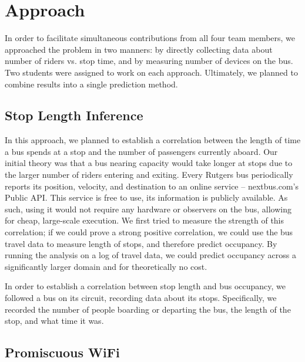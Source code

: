 \section{Approach}

In order to facilitate simultaneous contributions from all four team members, we approached the problem in two manners: by directly collecting data about number of riders vs. stop time, and by measuring number of devices on the bus.
Two students were assigned to work on each approach.
Ultimately, we planned to combine results into a single prediction method.

\subsection{Stop Length Inference}

In this approach, we planned to establish a correlation between the length of time a bus spends at a stop and the number of passengers currently aboard.
Our initial theory was that a bus nearing capacity would take longer at stops due to the larger number of riders entering and exiting.
Every Rutgers bus periodically reports its position, velocity, and destination to an online service -- nextbus.com's Public API.
This service is free to use, its information is publicly available. %
As such, using it would not require any hardware or observers on the bus, allowing for cheap, large-scale execution.
We first tried to measure the strength of this correlation; if we could prove a strong positive correlation, we could use the bus travel data to measure length of stops, and therefore predict occupancy.
By running the analysis on a log of travel data, we could predict occupancy across a significantly larger domain and for theoretically no cost.

In order to establish a correlation between stop length and bus occupancy, we followed a bus on its circuit, recording data about its stops. Specifically, we recorded the number of people boarding or departing the bus, the length of the stop, and what time it was.

\subsection{Promiscuous WiFi}


